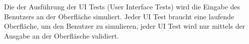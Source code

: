 
Die der Ausführung der UI Tests (User Interface Tests) wird die Eingabe des Benutzers an der Oberfläche simuliert.
Jeder UI Test braucht eine laufende Oberfläche, um den Benutzer zu simulieren, 
jeder UI Test wird nur mittels der Ausgabe an der Oberfläsche validiert.